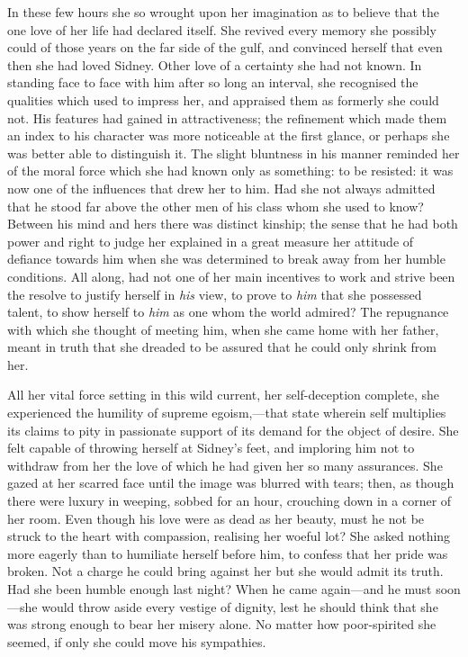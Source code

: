 In these few hours she so wrought upon her imagination as to believe
that the one love of her life had declared itself. She revived every
memory she possibly could of those years on the far side of the gulf,
and convinced herself that even then she had loved Sidney. Other love of
a certainty she had not known. In standing face to face with him after
so long an interval, she recognised the qualities which used to impress
her, and appraised them as formerly she could not. His features had
gained in attractiveness; the refinement which made them an index to his
character was more noticeable at the first glance, or perhaps she was
better able to distinguish it. The slight bluntness in his manner
reminded her of the moral force which she had known only as something:
to be resisted: it was now one of the influences that drew her to him.
Had she not always admitted that he stood far above the other men of his
class whom she {}used to know? Between his mind and hers there was
distinct kinship; the sense that he had both power and right to judge
her explained in a great measure her attitude of defiance towards him
when she was determined to break away from her humble conditions. All
along, had not one of her main incentives to work and strive been the
resolve to justify herself in \emph{his} view, to prove to \emph{him}
that she possessed talent, to show herself to \emph{him} as one whom the
world admired? The repugnance with which she thought of meeting him,
when she came home with her father, meant in truth that she dreaded to
be assured that he could only shrink from her.

All her vital force setting in this wild current, her self-deception
complete, she experienced the humility of supreme egoism,---that state
wherein self multiplies its claims to pity in passionate support of its
demand for the object of desire. She felt capable of throwing herself at
Sidney's feet, and imploring him not to withdraw from her the love of
which he had given her so many assurances. She gazed at her scarred face
until the image was blurred with tears; then, as though there were
luxury {}in weeping, sobbed for an hour, crouching down in a corner of
her room. Even though his love were as dead as her beauty, must he not
be struck to the heart with compassion, realising her woeful lot? She
asked nothing more eagerly than to humiliate herself before him, to
confess that her pride was broken. Not a charge he could bring against
her but she would admit its truth. Had she been humble enough last
night? When he came again---and he must soon---she would throw aside
every vestige of dignity, lest he should think that she was strong
enough to bear her misery alone. No matter how poor-spirited she seemed,
if only she could move his sympathies.

